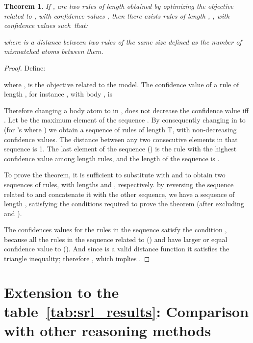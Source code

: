 \documentclass{article}
\newtheorem{theorem}{Theorem}
\begin{document}
\renewcommand\thetheorem{1}
\begin{theorem}
\label{thr:theorem_1_appendix}
If ,  are two rules of length  obtained by optimizing the objective related to , with confidence values , then there exists  rules of length , , with confidence values  such~that:

where  is a distance between two rules of the same size defined as the number of mismatched atoms between them.
\end{theorem}
\begin{proof}
Define:

where , is the objective related to the  model. The confidence value of a rule of length , for instance , with body , is

Therefore changing a body atom  to  in , does not decrease the confidence value iff . Let  be the maximum element of the sequence . By consequently changing  in  to  (for 's where ) we obtain a sequence of rules of length T, with non-decreasing confidence values. The distance between any two consecutive elements in that sequence is 1. The last element of the sequence () is the rule with the highest confidence value among length  rules, and the length of the sequence is .

To prove the theorem, it is sufficient to substitute  with  and  to obtain two sequences of rules, with lengths  and , respectively. by reversing the sequence related to  and concatenate it with the other sequence, we have a sequence of length , satisfying the conditions required to prove the theorem (after excluding  and ). 

The confidences values for the rules in the sequence satisfy the condition  , because all the rules in the sequence related to  () and  have larger or equal confidence value to  (). And since  is a valid distance function it satisfies the triangle inequality; therefore , which implies .    
\end{proof}


\section{Extension to the table~\ref{tab:srl_results}: Comparison with other reasoning methods}
\end{document}
